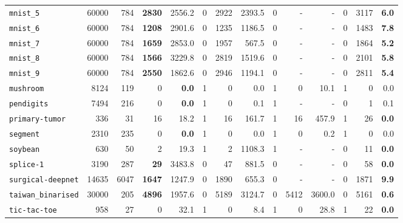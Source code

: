 \begin{tabular}{lccrrrrrrrrrrr}
\texttt{mnist\_5} & \multicolumn{1}{r}{60000} & \multicolumn{1}{r}{784}  & \textbf{2830} & 2556.2 & 0 & 2922 & 2393.5 & 0 & - & - & 0 & 3117 & \textbf{6.0}\\
\texttt{mnist\_6} & \multicolumn{1}{r}{60000} & \multicolumn{1}{r}{784}  & \textbf{1208} & 2901.6 & 0 & 1235 & 1186.5 & 0 & - & - & 0 & 1483 & \textbf{7.8}\\
\texttt{mnist\_7} & \multicolumn{1}{r}{60000} & \multicolumn{1}{r}{784}  & \textbf{1659} & 2853.0 & 0 & 1957 & 567.5 & 0 & - & - & 0 & 1864 & \textbf{5.2}\\
\texttt{mnist\_8} & \multicolumn{1}{r}{60000} & \multicolumn{1}{r}{784}  & \textbf{1566} & 3229.8 & 0 & 2819 & 1519.6 & 0 & - & - & 0 & 2101 & \textbf{5.8}\\
\texttt{mnist\_9} & \multicolumn{1}{r}{60000} & \multicolumn{1}{r}{784}  & \textbf{2550} & 1862.6 & 0 & 2946 & 1194.1 & 0 & - & - & 0 & 2811 & \textbf{5.4}\\
\texttt{mushroom} & \multicolumn{1}{r}{8124} & \multicolumn{1}{r}{119}  & 0 & \textbf{0.0} & 1 & 0 & 0.0 & 1 & 0 & 10.1 & 1 & 0 & 0.0\\
\texttt{pendigits} & \multicolumn{1}{r}{7494} & \multicolumn{1}{r}{216}  & 0 & \textbf{0.0} & 1 & 0 & 0.1 & 1 & - & - & 0 & 1 & 0.1\\
\texttt{primary-tumor} & \multicolumn{1}{r}{336} & \multicolumn{1}{r}{31}  & 16 & 18.2 & 1 & 16 & 161.7 & 1 & 16 & 457.9 & 1 & 26 & \textbf{0.0}\\
\texttt{segment} & \multicolumn{1}{r}{2310} & \multicolumn{1}{r}{235}  & 0 & \textbf{0.0} & 1 & 0 & 0.0 & 1 & 0 & 0.2 & 1 & 0 & 0.0\\
\texttt{soybean} & \multicolumn{1}{r}{630} & \multicolumn{1}{r}{50}  & 2 & 19.3 & 1 & 2 & 1108.3 & 1 & - & - & 0 & 11 & \textbf{0.0}\\
\texttt{splice-1} & \multicolumn{1}{r}{3190} & \multicolumn{1}{r}{287}  & \textbf{29} & 3483.8 & 0 & 47 & 881.5 & 0 & - & - & 0 & 58 & \textbf{0.0}\\
\texttt{surgical-deepnet} & \multicolumn{1}{r}{14635} & \multicolumn{1}{r}{6047}  & \textbf{1647} & 1247.9 & 0 & 1890 & 655.3 & 0 & - & - & 0 & 1871 & \textbf{9.9}\\
\texttt{taiwan\_binarised} & \multicolumn{1}{r}{30000} & \multicolumn{1}{r}{205}  & \textbf{4896} & 1957.6 & 0 & 5189 & 3124.7 & 0 & 5412 & 3600.0 & 0 & 5161 & \textbf{0.6}\\
\texttt{tic-tac-toe} & \multicolumn{1}{r}{958} & \multicolumn{1}{r}{27}  & 0 & 32.1 & 1 & 0 & 8.4 & 1 & 0 & 28.8 & 1 & 22 & \textbf{0.0}\\

\end{tabular}
